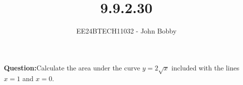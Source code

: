 \documentclass[journal]{IEEEtran}
\begin{document}

\vspace{3cm}
\title{9.9.2.30}
\author{EE24BTECH11032 - John Bobby}
{\let\newpage\relax\maketitle}

\renewcommand{\thefigure}{\theenumi}
\renewcommand{\thetable}{\theenumi}
\setlength{\intextsep}{10pt} %


\renewcommand{\thetable}{\theenumi}


\textbf{Question:}Calculate the area under the curve $y=2\sqrt{x}$ included with the lines $x=1$ and $x=0$.\\
\end{document}
